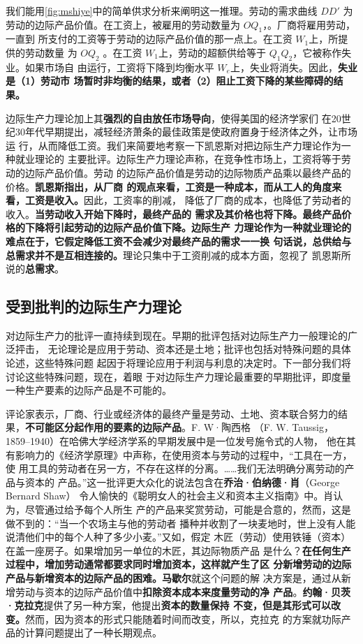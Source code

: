 我们能用\cref{fig:mshiye}中的简单供求分析来阐明这一推理。劳动的需求曲线 $DD'$ 为
劳动的边际产品价值。在工资上，被雇用的劳动数量为 $OQ_1$，。厂商将雇用劳动，一直到
所支付的工资等于劳动的边际产品价值的那一点上。在工资 $W_1$上，所提供的劳动数量
为 $OQ_2$ 。在工资 $W_1$上，劳动的超额供给等于 $Q_1Q_2$，它被称作失业。如果市场自
由运行，工资将下降到均衡水平 $W_e$上，失业将消失。因此，\textbf{失业是（1）劳动市
  场暂时非均衡的结果，或者（2）阻止工资下降的某些障碍的结果。}

边际生产力理论加上其\textbf{强烈的自由放任市场导向}，使得美国的经济学家们
在20世纪30年代早期提出，减轻经济萧条的最佳政策是使政府置身于经济体之外，让市场运
行，从而降低工资。我们来简要地考察一下凯恩斯对把边际生产力理论作为一种就业理论的
主要批评。边际生产力理论声称，在竞争性市场上，工资将等于劳动的边际产品价值。劳动
的边际产品价值是劳动的边际物质产品乘以最终产品的价格。\textbf{凯恩斯指出，从厂商
  的观点来看，工资是一种成本，而从工人的角度来看，工资是收入。}因此，工资率的削减，
降低了厂商的成本，也降低了劳动者的收入。\textbf{当劳动收入开始下降时，最终产品的
  需求及其价格也将下降。最终产品价格的下降将引起劳动的边际产品价值下降。边际生产
  力理论作为一种就业理论的难点在于，它假定降低工资不会减少对最终产品的需求一一换
  句话说，总供给与总需求并不是互相连接的。}理论只集中于工资削减的成本方面，忽视了
凯恩斯所说的\textbf{总需求}。

\subsection{受到批判的边际生产力理论}

对边际生产力的批评一直持续到现在。早期的批评包括对边际生产力一般理论的广泛抨击，
无论理论是应用于劳动、资本还是土地；批评也包括对特殊问题的具体论述，这些特殊问题
起因于将理论应用于利润与利息的决定时。下一部分我们将讨论这些特殊问题，现在，着眼
于对边际生产力理论最重要的早期批评，即度量一种生产要素的边际产品是不可能的。

评论家表示，厂商、行业或经济体的最终产量是劳动、土地、资本联合努力的结
果，\textbf{不可能区分起作用的要素的边际产品}。F. W·陶西格
（F. W. Taussig，1859--1940）在哈佛大学经济学系的早期发展中是一位发号施令式的人物，
他在其有影响力的《经济学原理》中声称，在使用资本与劳动的过程中，“工具在一方，使
用工具的劳动者在另一方，不存在这样的分离。……我们无法明确分离劳动的产品与资本的
产品。”这一批评更大众化的说法包含在\textbf{乔治·伯纳德·肖}（George Bernard Shaw）
令人愉快的《聪明女人的社会主义和资本主义指南》中。肖认为，尽管通过给予每个人所生
产的产品来奖赏劳动，可能是合意的，然而，这是做不到的：“当一个农场主与他的劳动者
播种并收割了一块麦地时，世上没有人能说清他们中的每个人种了多少小麦。”又如，假定
木匠（劳动）使用铁锤（资本）在盖一座房子。如果增加另一单位的木匠，其边际物质产品
是什么？\textbf{在任何生产过程中，增加劳动通常都要求同时增加资本，这样就产生了区
  分新增劳动的边际产品与新增资本的边际产品的困难。}\textbf{马歇尔}就这个问题的解
决方案是，通过从新增劳动与资本的边际产品价值中\textbf{扣除资本成本来度量劳动的净
  产品}。\textbf{约翰·贝茨·克拉克}提供了另一种方案，他提出\textbf{资本的数量保持
  不变，但是其形式可以改变。}然而，因为资本的形式只能随着时间而改变，所以，克拉克
的方案就功际产品的计算问题提出了一种长期观点。

